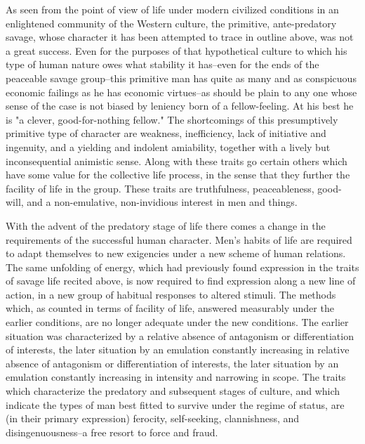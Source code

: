 \documentclass[12pt]{report}
\begin{document}
As seen from the point of view of life under modern civilized conditions
in an enlightened community of the Western culture, the primitive,
ante-predatory savage, whose character it has been attempted to trace
in outline above, was not a great success. Even for the purposes of
that hypothetical culture to which his type of human nature owes what
stability it has--even for the ends of the peaceable savage group--this
primitive man has quite as many and as conspicuous economic failings as
he has economic virtues--as should be plain to any one whose sense of
the case is not biased by leniency born of a fellow-feeling. At his
best he is "a clever, good-for-nothing fellow." The shortcomings of this
presumptively primitive type of character are weakness, inefficiency,
lack of initiative and ingenuity, and a yielding and indolent
amiability, together with a lively but inconsequential animistic sense.
Along with these traits go certain others which have some value for the
collective life process, in the sense that they further the facility
of life in the group. These traits are truthfulness, peaceableness,
good-will, and a non-emulative, non-invidious interest in men and
things.

With the advent of the predatory stage of life there comes a change in
the requirements of the successful human character. Men's habits of life
are required to adapt themselves to new exigencies under a new scheme
of human relations. The same unfolding of energy, which had previously
found expression in the traits of savage life recited above, is now
required to find expression along a new line of action, in a new group
of habitual responses to altered stimuli. The methods which, as counted
in terms of facility of life, answered measurably under the earlier
conditions, are no longer adequate under the new conditions. The earlier
situation was characterized by a relative absence of antagonism or
differentiation of interests, the later situation by an emulation
constantly increasing in relative absence of antagonism or
differentiation of interests, the later situation by an emulation
constantly increasing in intensity and narrowing in scope. The traits
which characterize the predatory and subsequent stages of culture, and
which indicate the types of man best fitted to survive under the regime
of status, are (in their primary expression) ferocity, self-seeking,
clannishness, and disingenuousness--a free resort to force and fraud.
\end{document}
